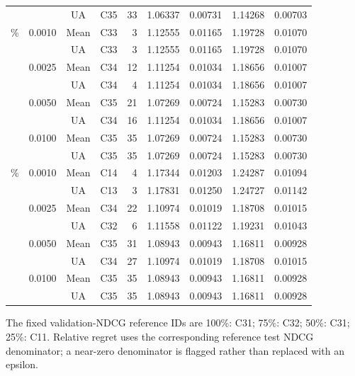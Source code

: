 \begin{table}[H]
{\begin{tabular}{@{}llccrrrrr@{}}
 &  & UA & C35 & 33 & 1.06337 & 0.00731 & 1.14268 & 0.00703 \\
\addlinespace
50\% & 0.0010 & Mean & C33 & 3 & 1.12555 & 0.01165 & 1.19728 & 0.01070 \\
 &  & UA & C33 & 3 & 1.12555 & 0.01165 & 1.19728 & 0.01070 \\
 & 0.0025 & Mean & C34 & 12 & 1.11254 & 0.01034 & 1.18656 & 0.01007 \\
 &  & UA & C34 & 4 & 1.11254 & 0.01034 & 1.18656 & 0.01007 \\
 & 0.0050 & Mean & C35 & 21 & 1.07269 & 0.00724 & 1.15283 & 0.00730 \\
 &  & UA & C34 & 16 & 1.11254 & 0.01034 & 1.18656 & 0.01007 \\
 & 0.0100 & Mean & C35 & 35 & 1.07269 & 0.00724 & 1.15283 & 0.00730 \\
 &  & UA & C35 & 35 & 1.07269 & 0.00724 & 1.15283 & 0.00730 \\
\addlinespace
25\% & 0.0010 & Mean & C14 & 4 & 1.17344 & 0.01203 & 1.24287 & 0.01094 \\
 &  & UA & C13 & 3 & 1.17831 & 0.01250 & 1.24727 & 0.01142 \\
 & 0.0025 & Mean & C34 & 22 & 1.10974 & 0.01019 & 1.18708 & 0.01015 \\
 &  & UA & C32 & 6 & 1.11558 & 0.01122 & 1.19231 & 0.01043 \\
 & 0.0050 & Mean & C35 & 31 & 1.08943 & 0.00943 & 1.16811 & 0.00928 \\
 &  & UA & C34 & 27 & 1.10974 & 0.01019 & 1.18708 & 0.01015 \\
 & 0.0100 & Mean & C35 & 35 & 1.08943 & 0.00943 & 1.16811 & 0.00928 \\
 &  & UA & C35 & 35 & 1.08943 & 0.00943 & 1.16811 & 0.00928 \\
\bottomrule
\end{tabular}%
}
\par\smallskip\footnotesize The fixed validation-NDCG reference IDs are 100\%: C31; 75\%: C32; 50\%: C31; 25\%: C11. Relative regret uses the corresponding reference test NDCG denominator; a near-zero denominator is flagged rather than replaced with an epsilon.
\end{table}
